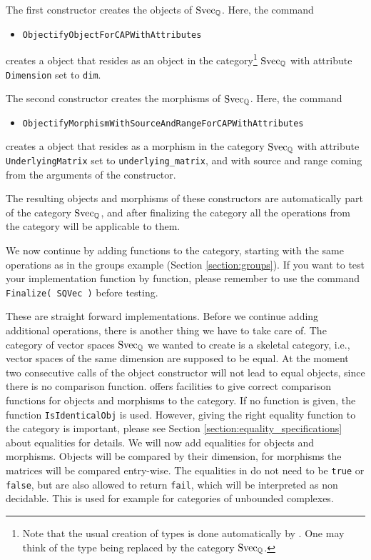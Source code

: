 

The first constructor creates the objects of $\mathrm{Svec}_{\mathbb{Q}}$.
Here, the \CapPkg command
\begin{itemize}
  \item \texttt{ObjectifyObjectForCAPWithAttributes}
\end{itemize}
creates a \GAP object that resides as an object in the category\footnote{
  Note that the usual creation of \GAP types is done automatically by \CapPkg.
One may think of the \GAP type being replaced by the category $\mathrm{Svec}_{\mathbb{Q}}$.
}
$\mathrm{Svec}_{\mathbb{Q}}$ with attribute \texttt{Dimension} set to \texttt{dim}.

The second constructor creates the morphisms of $\mathrm{Svec}_{\mathbb{Q}}$.
Here, the \CapPkg command
\begin{itemize}
  \item \texttt{ObjectifyMorphismWithSourceAndRangeForCAPWithAttributes}
\end{itemize}
creates a \GAP object that resides as a morphism in the category
$\mathrm{Svec}_{\mathbb{Q}}$ with attribute \texttt{UnderlyingMatrix} set to \texttt{underlying\_matrix},
and with source and range coming from the arguments of the constructor.

The resulting objects and morphisms of these constructors
are automatically part of the category $\mathrm{Svec}_{\mathbb{Q}}$, and after finalizing the category all the operations from the
category will be applicable to them.

We now continue by adding functions to the category, starting with the same operations as in the groups example (Section \ref{section:groups}).
If you want to test your implementation function by function,
please remember to use the command \texttt{Finalize( SQVec )}
before testing. 



These are straight forward implementations. Before we continue
adding additional operations, there is another thing we have to take care of. The category of vector spaces $\mathrm{Svec}_{\mathbb{Q}}$ we wanted
to create is a skeletal category, i.e., vector spaces of the same dimension are supposed to be equal. At the moment
two consecutive calls of the object constructor will not lead to equal objects, since there is no comparison function.
\CapPkg offers facilities to give correct comparison functions for objects and morphisms to the category. If no function
is given, the \GAP function \texttt{IsIdenticalObj} is used. However, giving the right equality function to the
category is important, please see Section \ref{section:equality_specifications} about equalities for details. We will now add equalities
for objects and morphisms. Objects will be compared by their dimension, for morphisms the matrices will be compared entry-wise.
The equalities in \CapPkg do not need to be \texttt{true} or \texttt{false}, but are also allowed to return \texttt{fail},
which will be interpreted as non decidable. This is used for example for categories of unbounded complexes.

